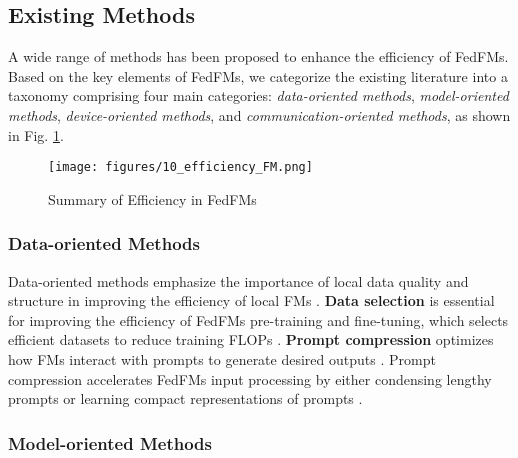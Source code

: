 \subsection{Existing Methods}

A wide range of methods has been proposed to enhance the efficiency of FedFMs. Based on the key elements of FedFMs, we categorize the existing literature into a taxonomy comprising four main categories: \textit{data-oriented methods}, \textit{model-oriented methods}, \textit{device-oriented methods}, and \textit{communication-oriented methods}, as shown in Fig. \ref{fig:efficiency_fm}.

\begin{figure}[t]
    \centering
     \texttt{[image: figures/10\_efficiency\_FM.png]}
     \caption{Summary of Efficiency in FedFMs}
     \label{fig:efficiency_fm}
     \vspace{-5mm}
 \end{figure}

\subsubsection{Data-oriented Methods}

Data-oriented methods emphasize the importance of local data quality and structure in improving the efficiency of local FMs \cite{ye2024openfedllm, qin2024federated}. \textbf{Data selection} is essential for improving the efficiency of FedFMs pre-training and fine-tuning, which selects efficient datasets to reduce training FLOPs \cite{yao2022nlp, fawcett2024improving}. \textbf{Prompt compression} optimizes how FMs interact with prompts to generate desired outputs \cite{che2023federated}. Prompt compression accelerates FedFMs input processing by either condensing lengthy prompts or learning compact representations of prompts \cite{mu2024learning}.

\subsubsection{Model-oriented Methods}

